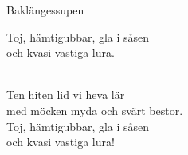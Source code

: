 \begin{song}{Baklängessupen}
	
	
	
	
	\begin{repetition}
		Toj, hämtigubbar, gla i såsen\\
		och kvasi vastiga lura.
	\end{repetition}\\
	Ten hiten lid vi heva lär\\
	med möcken myda och svärt bestor.\\
	Toj, hämtigubbar, gla i såsen\\
	och kvasi vastiga lura!
	
\end{song}
